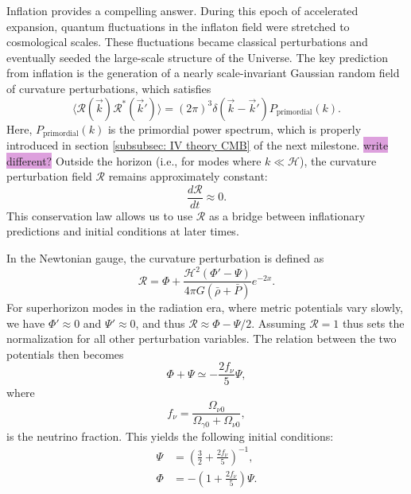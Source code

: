 \documentclass{aa}
\numberwithin{equation}{section}
\numberwithin{table}{section}
\numberwithin{figure}{section}
\begin{document}
Inflation provides a compelling answer. During this epoch of accelerated expansion, quantum fluctuations in the inflaton field were stretched to cosmological scales. These fluctuations became classical perturbations and eventually seeded the large-scale structure of the Universe. The key prediction from inflation is the generation of a nearly scale-invariant Gaussian random field of curvature perturbations, which satisfies
\begin{equation}
  \langle\mathcal{R}(\vec{k})\mathcal{R}^*(\vec{k}')\rangle = (2\pi)^3\delta(\vec{k}-\vec{k}')P_\text{primordial}(k).
\end{equation}
Here, $P_\text{primordial}(k)$ is the primordial power spectrum, which is properly introduced in section \ref{subsubsec: IV theory CMB} of the next milestone. \colorbox{Plum}{write different?} Outside the horizon (i.e., for modes where $k \ll \mathcal{H}$), the curvature perturbation field $\mathcal{R}$ remains approximately constant:
\begin{equation}
\frac{d\mathcal{R}}{dt} \approx 0.
\end{equation}
This conservation law allows us to use $\mathcal{R}$ as a bridge between inflationary predictions and initial conditions at later times. 

In the Newtonian gauge, the curvature perturbation is defined as
\begin{equation}
\mathcal{R} = \Phi + \frac{\mathcal{H}^2\left( \Phi' - \Psi \right)}{4\pi G (\bar{\rho} + \bar{P})}e^{-2x}.
\end{equation}
For superhorizon modes in the radiation era, where metric potentials vary slowly, we have $\Phi' \approx 0$ and $\Psi' \approx 0$, and thus $\mathcal{R} \approx \Phi - \Psi/2$. Assuming $\mathcal{R} = 1$ thus sets the normalization for all other perturbation variables. The relation between the two potentials then becomes
\begin{equation}
\Phi + \Psi \simeq -\frac{2f_\nu}{5} \Psi,
\end{equation}
where 
\begin{equation}
  f_\nu = \frac{\Omega_{\nu 0}}{\Omega_{\gamma 0} + \Omega_{\nu 0}}, 
\end{equation}
is the neutrino fraction. This yields the following initial conditions:
\begin{align}
\Psi &= \left(\frac{3}{2} + \frac{2f_\nu}{5}\right)^{-1}, \\
\Phi &= -\left(1 + \frac{2f_\nu}{5} \right)\Psi.
\end{align}
\end{document}
